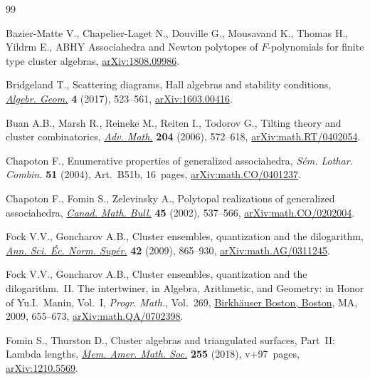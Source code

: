 \begin{thebibliography}{99}
\footnotesize\itemsep=0pt

Bazier-Matte V., Chapelier-Laget N., Douville G., Mousavand K., Thomas H.,
 Yildrm E., {ABHY} Associahedra and Newton polytopes of ${F}$-polynomials for
 finite type cluster algebras, \href{https://arxiv.org/abs/1808.09986}{arXiv:1808.09986}.

Bridgeland T., Scattering diagrams, {H}all algebras and stability conditions,
 \href{https://doi.org/10.14231/2017-027}{\textit{Algebr. Geom.}} \textbf{4} (2017), 523--561, \href{https://arxiv.org/abs/1603.00416}{arXiv:1603.00416}.

Buan A.B., Marsh R., Reineke M., Reiten I., Todorov G., Tilting theory and
 cluster combinatorics, \href{https://doi.org/10.1016/j.aim.2005.06.003}{\textit{Adv. Math.}} \textbf{204} (2006), 572--618,
 \href{https://arxiv.org/abs/math.RT/0402054}{arXiv:math.RT/0402054}.

Chapoton F., Enumerative properties of generalized associahedra, \textit{S\'em.
 Lothar. Combin.} \textbf{51} (2004), Art.~B51b, 16~pages,
 \href{https://arxiv.org/abs/math.CO/0401237}{arXiv:math.CO/0401237}.

Chapoton F., Fomin S., Zelevinsky A., Polytopal realizations of generalized
 associahedra, \href{https://doi.org/10.4153/CMB-2002-054-1}{\textit{Canad. Math. Bull.}} \textbf{45} (2002), 537--566,
 \href{https://arxiv.org/abs/math.CO/0202004}{arXiv:math.CO/0202004}.

Fock V.V., Goncharov A.B., Cluster ensembles, quantization and the dilogarithm,
 \href{https://doi.org/10.24033/asens.2112}{\textit{Ann. Sci. \'Ec. Norm. Sup\'er.}} \textbf{42} (2009), 865--930,
 \href{https://arxiv.org/abs/math.AG/0311245}{arXiv:math.AG/0311245}.

Fock V.V., Goncharov A.B., Cluster ensembles, quantization and the
 dilogarithm.~{II}. {T}he intertwiner, in Algebra, Arithmetic, and Geometry:
 in Honor of {Y}u.{I}.~{M}anin, {V}ol.~{I}, \textit{Progr. Math.}, Vol.~269,
 \href{https://doi.org/10.1007/978-0-8176-4745-2_15}{Birkh\"auser Boston, Boston}, MA, 2009, 655--673,
 \href{https://arxiv.org/abs/math.QA/0702398}{arXiv:math.QA/0702398}.

Fomin S., Thurston D., Cluster algebras and triangulated surfaces, {P}art~{II}:
 {L}ambda lengths, \href{https://doi.org/10.1090/memo/1223}{\textit{Mem. Amer. Math. Soc.}} \textbf{255} (2018),
 v+97~pages, \href{https://arxiv.org/abs/1210.5569}{arXiv:1210.5569}.


\end{thebibliography}
